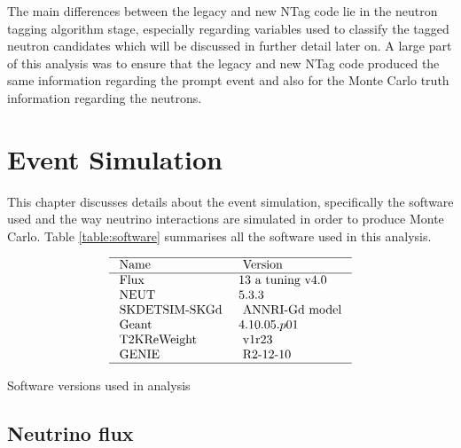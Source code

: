 The main differences between the legacy and new NTag code lie in the neutron tagging algorithm stage, especially regarding variables used to classify the tagged neutron candidates which will be discussed in further detail later on. A large part of this analysis was to ensure that the legacy and new NTag code produced the same information regarding the prompt event and also for the Monte Carlo truth information regarding the neutrons. 



\section{Event Simulation}

This chapter discusses details about the event simulation, specifically the software used and the way neutrino interactions are simulated in order to produce Monte Carlo. Table \ref{table:software} summarises all the software used in this analysis. 


\begin{table}
$$
\begin{array}{ll}
\hline \text { Name } & \text { Version } \\
\hline \text { Flux } & 13 \text { a tuning v4.0 } \\
\text { NEUT } & 5.3 .3 \\
\text { SKDETSIM-SKGd } & \text { ANNRI-Gd model } \\
\text { Geant } & 4.10.05.p01 \\
\text { T2KReWeight } & \text { v1r23 } \\
\text { GENIE } & \text { R2-12-10 } \\
\hline
\end{array}
$$
\caption{Software versions used in analysis}
\label{table:software}
\end{table}

\subsection{Neutrino flux}

